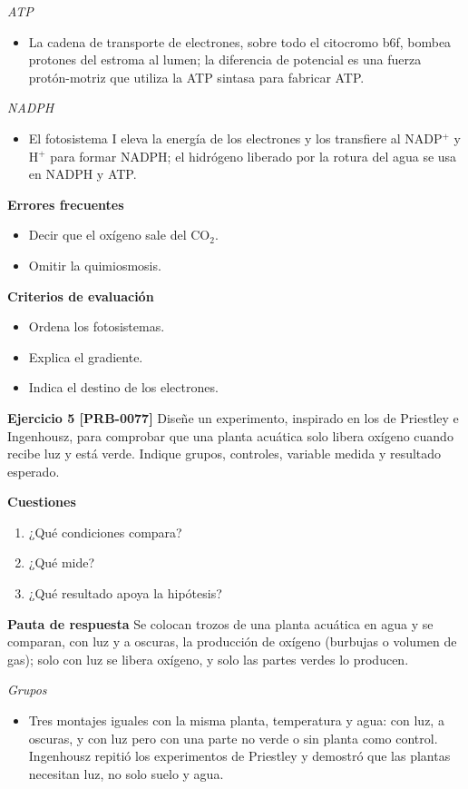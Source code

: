 \documentclass{book}
\begin{document}
\noindent\textit{ATP}
\begin{itemize}
\item La cadena de transporte de electrones, sobre todo el citocromo b6f, bombea protones del estroma al lumen; la diferencia de potencial es una fuerza protón-motriz que utiliza la ATP sintasa para fabricar ATP.
\end{itemize}

\noindent\textit{NADPH}
\begin{itemize}
\item El fotosistema I eleva la energía de los electrones y los transfiere al NADP\({}^{+}\) y H\({}^{+}\) para formar NADPH; el hidrógeno liberado por la rotura del agua se usa en NADPH y ATP.
\end{itemize}

\noindent\textbf{Errores frecuentes}
\begin{itemize}
\item Decir que el oxígeno sale del CO\({}_{2}\).
\item Omitir la quimiosmosis.
\end{itemize}

\noindent\textbf{Criterios de evaluación}
\begin{itemize}
\item Ordena los fotosistemas.
\item Explica el gradiente.
\item Indica el destino de los electrones.
\end{itemize}

\noindent\textbf{Ejercicio 5 [PRB-0077]}
Diseñe un experimento, inspirado en los de Priestley e Ingenhousz, para comprobar que una planta acuática solo libera oxígeno cuando recibe luz y está verde. Indique grupos, controles, variable medida y resultado esperado.


\noindent\textbf{Cuestiones}
\begin{enumerate}
\item ¿Qué condiciones compara?
\item ¿Qué mide?
\item ¿Qué resultado apoya la hipótesis?
\end{enumerate}

\noindent\textbf{Pauta de respuesta}
Se colocan trozos de una planta acuática en agua y se comparan, con luz y a oscuras, la producción de oxígeno (burbujas o volumen de gas); solo con luz se libera oxígeno, y solo las partes verdes lo producen.


\noindent\textit{Grupos}
\begin{itemize}
\item Tres montajes iguales con la misma planta, temperatura y agua: con luz, a oscuras, y con luz pero con una parte no verde o sin planta como control. Ingenhousz repitió los experimentos de Priestley y demostró que las plantas necesitan luz, no solo suelo y agua.
\end{itemize}
\end{document}
